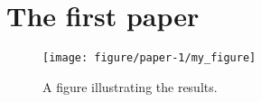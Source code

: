 \chapter{The first paper}
\label{ch:first_paper}


\begingroup
\endgroup


\chapabstract{
    \lipsum[1]
}

\lipsum[1-5]

\begin{figure}
    \centering
    \texttt{[image: figure/paper-1/my\_figure]}
    \caption{A figure illustrating the results.}
    \label{fig1:my_figure}
\end{figure}
